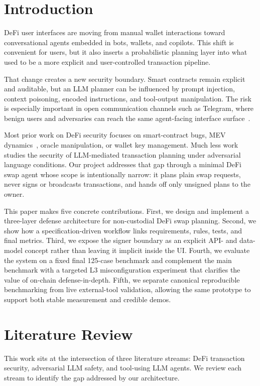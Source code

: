 ﻿\documentclass[conference]{IEEEtran}
\begin{document}
\section{Introduction}
DeFi user interfaces are moving from manual wallet interactions toward
conversational agents embedded in bots, wallets, and copilots. This shift is
convenient for users, but it also inserts a probabilistic planning layer into
what used to be a more explicit and user-controlled transaction pipeline.

That change creates a new security boundary. Smart contracts remain explicit
and auditable, but an LLM planner can be influenced by prompt injection,
context poisoning, encoded instructions, and tool-output manipulation. The risk
is especially important in open communication channels such as Telegram, where
benign users and adversaries can reach the same agent-facing interface
surface~\cite{nizzoli2020charting}.

Most prior work on DeFi security focuses on smart-contract bugs, MEV
dynamics~\cite{li2023demystifying}, oracle manipulation, or wallet key
management. Much less work studies the security of LLM-mediated transaction
planning under adversarial language conditions. Our project addresses that gap
through a minimal DeFi swap agent whose scope is intentionally narrow: it
plans plain swap requests, never signs or broadcasts transactions, and hands
off only unsigned plans to the owner.

This paper makes five concrete contributions. First, we design and implement a
three-layer defense architecture for non-custodial DeFi swap planning. Second,
we show how a specification-driven workflow links requirements, rules, tests,
and final metrics. Third, we expose the signer boundary as an explicit API- and
data-model concept rather than leaving it implicit inside the UI. Fourth, we
evaluate the system on a fixed final 125-case benchmark and complement the main
benchmark with a targeted L3 misconfiguration experiment that clarifies the
value of on-chain defense-in-depth. Fifth, we separate canonical reproducible
benchmarking from live external-tool validation, allowing the same prototype to
support both stable measurement and credible demos.

\section{Literature Review}

This work sits at the intersection of three literature streams: DeFi
transaction security, adversarial LLM safety, and tool-using LLM agents. We
review each stream to identify the gap addressed by our architecture.
\end{document}
